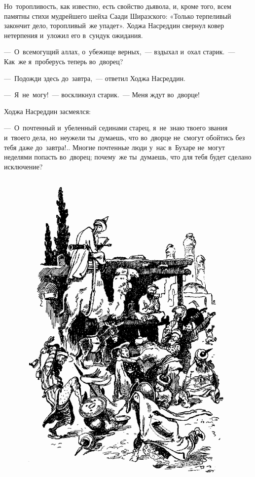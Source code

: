 \documentclass[12pt,a4paper]{book}
\begin{document}
Но~торопливость, как известно, есть свойство дьявола, и, кроме того, всем памятны стихи мудрейшего шейха Саади Ширазского: «Только терпеливый закончит дело, торопливый~же упадет». Ходжа Насреддин свернул ковер нетерпения и~уложил его в~сундук ожидания.

—~О~всемогущий аллах, о~убежище верных,~— вздыхал и~охал старик.~— Как~же я~проберусь теперь во~дворец?

—~Подожди здесь до~завтра,~— ответил Ходжа Насреддин.

—~Я~не~могу!~— воскликнул старик.~— Меня ждут во~дворце!

Ходжа Насреддин засмеялся:

—~О~почтенный и~убеленный сединами старец, я~не~знаю твоего звания и~твоего дела, но~неужели ты~думаешь, что во~дворце не~смогут обойтись без тебя даже до~завтра!.. Многие почтенные люди у~нас в~Бухаре не~могут неделями попасть во~дворец; почему~же ты~думаешь, что для тебя будет сделано исключение?

\begin{figure}[p]
\centering
\includegraphics[width=\textwidth]{12.png}
\end{figure}
\end{document}
